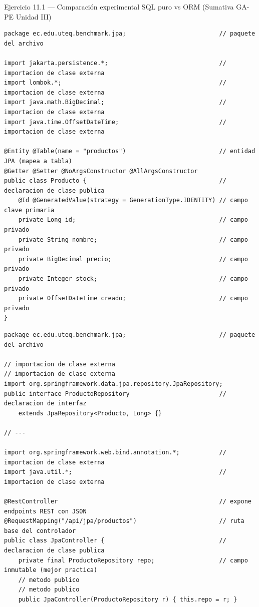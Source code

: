 \documentclass[11pt,a4paper,openany]{book}
\begin{document}
\begin{cajaejercicio}{Ejercicio 11.1 --- Comparación experimental SQL puro vs ORM (Sumativa GA-PE Unidad III)}
\begin{lstlisting}[style=java,caption={Producto.java},label=lst:11.20]
package ec.edu.uteq.benchmark.jpa;                          // paquete del archivo

import jakarta.persistence.*;                               // importacion de clase externa
import lombok.*;                                            // importacion de clase externa
import java.math.BigDecimal;                                // importacion de clase externa
import java.time.OffsetDateTime;                            // importacion de clase externa

@Entity @Table(name = "productos")                          // entidad JPA (mapea a tabla)
@Getter @Setter @NoArgsConstructor @AllArgsConstructor
public class Producto {                                     // declaracion de clase publica
    @Id @GeneratedValue(strategy = GenerationType.IDENTITY) // campo clave primaria
    private Long id;                                        // campo privado
    private String nombre;                                  // campo privado
    private BigDecimal precio;                              // campo privado
    private Integer stock;                                  // campo privado
    private OffsetDateTime creado;                          // campo privado
}
\end{lstlisting}

\begin{lstlisting}[style=java,caption={ProductoRepository.java + JpaController.java},label=lst:11.21]
package ec.edu.uteq.benchmark.jpa;                          // paquete del archivo

// importacion de clase externa
// importacion de clase externa
import org.springframework.data.jpa.repository.JpaRepository;
public interface ProductoRepository                         // declaracion de interfaz
    extends JpaRepository<Producto, Long> {}

// ---

import org.springframework.web.bind.annotation.*;           // importacion de clase externa
import java.util.*;                                         // importacion de clase externa

@RestController                                             // expone endpoints REST con JSON
@RequestMapping("/api/jpa/productos")                       // ruta base del controlador
public class JpaController {                                // declaracion de clase publica
    private final ProductoRepository repo;                  // campo inmutable (mejor practica)
    // metodo publico
    // metodo publico
    public JpaController(ProductoRepository r) { this.repo = r; }


\end{lstlisting}
\end{cajaejercicio}
\end{document}
